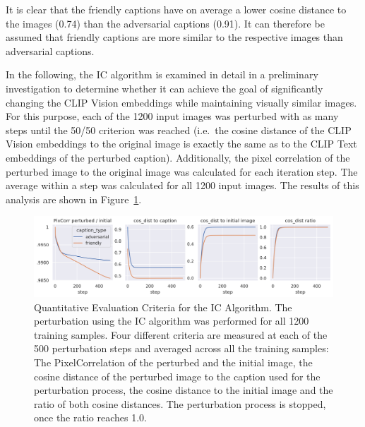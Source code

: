 \noindent{}It is clear that the friendly captions have on average a lower cosine distance to the images (0.74) than the adversarial captions (0.91). It can therefore be assumed that friendly captions are more similar to the respective images than adversarial captions. 

In the following, the IC algorithm is examined in detail in a preliminary investigation to determine whether it can achieve the goal of significantly changing the CLIP Vision embeddings while maintaining visually similar images. For this purpose, each of the 1200 input images was perturbed with as many steps until the 50/50 criterion was reached (i.e.\ the cosine distance of the CLIP Vision embeddings to the original image is exactly the same as to the CLIP Text embeddings of the perturbed caption). Additionally, the pixel correlation of the perturbed image to the original image was calculated for each iteration step. The average within a step was calculated for all 1200 input images. The results of this analysis are shown in Figure~\ref{fig:advpert_validation_ic_loss_curves}. 


\begin{figure}[ht]
    \centering
    \includegraphics[width=1\textwidth]{plots/advpert_validation_ic_loss_curves.png}
    \caption[Quantitative Evaluation Criteria for the IC Algorithm]{Quantitative Evaluation Criteria for the IC Algorithm. The perturbation using the IC algorithm was performed for all 1200 training samples. Four different criteria are measured at each of the 500 perturbation steps and averaged across all the training samples: The PixelCorrelation of the perturbed and the initial image, the cosine distance of the perturbed image to the caption used for the perturbation process, the cosine distance to the initial image and the ratio of both cosine distances. The perturbation process is stopped, once the ratio reaches 1.0.}\label{fig:advpert_validation_ic_loss_curves}
\end{figure}

